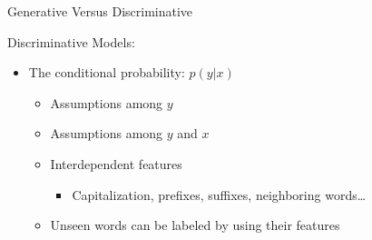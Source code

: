 \documentclass[presentation,bigger]{beamer}
\begin{document}
\begin{frame}[label={sec:orgheadline6}]{Generative Versus Discriminative}
\begin{block}{Discriminative Models:}
\begin{itemize}
\item The conditional probability: \(p(y|x)\)
\begin{itemize}
\item Assumptions among \(y\)
\item Assumptions among \(y\) and \(x\)
\item Interdependent features
\begin{itemize}
\item Capitalization, prefixes, suffixes, neighboring words\ldots{}
\end{itemize}
\item Unseen words can be labeled by using their features
\end{itemize}
\end{itemize}
\end{block}
\end{frame}
\end{document}
